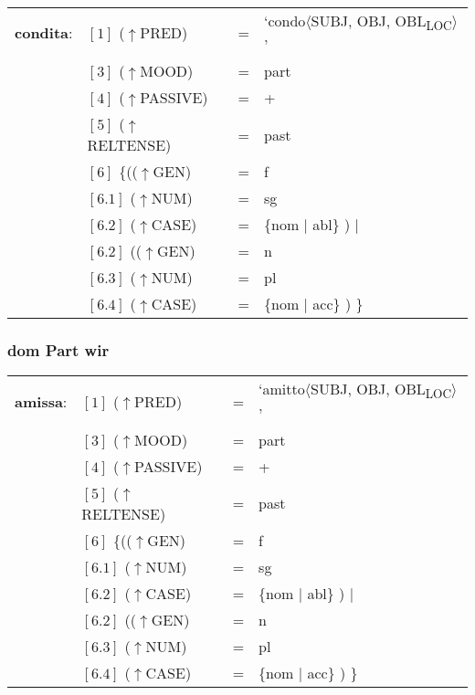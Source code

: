 \documentclass[12pt,a4paper]{article}
\begin{document}
\begin{singlespace}
\begin{tabular}{ l  l  l  l  } 
\textbf{condita}: & $[1]$ \:  ($\uparrow$PRED) & = & `condo$\langle$SUBJ, OBJ, OBL\textsubscript{LOC}$\rangle$'\\
$\qquad$ & $[3]$ \:  ($\uparrow$MOOD) & = & part\\
$\qquad$ & $[4]$ \:  ($\uparrow$PASSIVE) & = & + \\
$\qquad$ & $[5]$ \:  ($\uparrow$RELTENSE) & = & past \\
$\qquad$ & $[6]$ \:  \{(($\uparrow$GEN) & = & f \\ 
$\qquad$ & $[6.1]$ \:  ($\uparrow$NUM) & = & sg \\
$\qquad$ & $[6.2]$ \:  ($\uparrow$CASE) & = & \{nom $\mid$ abl\} ) $\mid$\\
$\qquad$ & $[6.2]$ \: (($\uparrow$GEN) & = & n \\
$\qquad$ & $[6.3]$ \:  ($\uparrow$NUM) & = & pl \\
$\qquad$ & $[6.4]$ \:  ($\uparrow$CASE) & = & \{nom $\mid$ acc\} ) \}\\
\end{tabular}
\newline
\newline
\end{singlespace}

\subsubsection{dom Part wir}

\begin{singlespace}
\begin{tabular}{ l  l  l  l  } 
\textbf{amissa}: & $[1]$ \:  ($\uparrow$PRED) & = & `amitto$\langle$SUBJ, OBJ, OBL\textsubscript{LOC}$\rangle$'\\
$\qquad$ & $[3]$ \:  ($\uparrow$MOOD) & = & part\\
$\qquad$ & $[4]$ \:  ($\uparrow$PASSIVE) & = & + \\
$\qquad$ & $[5]$ \:  ($\uparrow$RELTENSE) & = & past \\
$\qquad$ & $[6]$ \:  \{(($\uparrow$GEN) & = & f \\ 
$\qquad$ & $[6.1]$ \:  ($\uparrow$NUM) & = & sg \\
$\qquad$ & $[6.2]$ \:  ($\uparrow$CASE) & = & \{nom $\mid$ abl\} ) $\mid$\\
$\qquad$ & $[6.2]$ \: (($\uparrow$GEN) & = & n \\
$\qquad$ & $[6.3]$ \:  ($\uparrow$NUM) & = & pl \\
$\qquad$ & $[6.4]$ \:  ($\uparrow$CASE) & = & \{nom $\mid$ acc\} ) \}\\
\end{tabular}
\newline
\newline
\end{singlespace}
\end{document}
